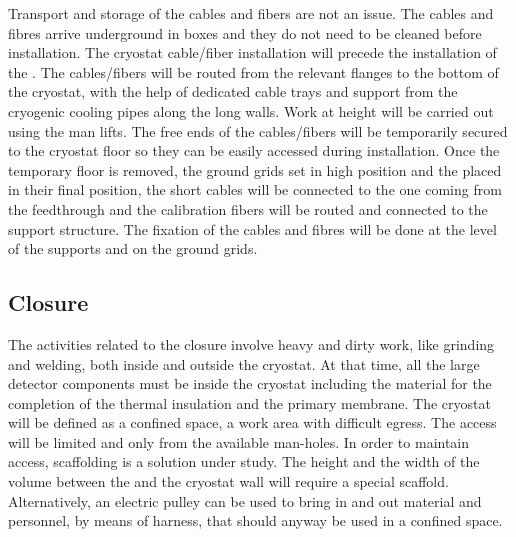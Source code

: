 Transport and storage of the cables and fibers are not an issue.
The cables and fibres arrive underground in boxes and they do not need to be cleaned before installation.
The cryostat cable/fiber installation will precede the installation of the .
The cables/fibers will be routed from the relevant flanges to the bottom of the cryostat, with the help of dedicated cable trays and support from the cryogenic cooling pipes along the long walls.
Work at height will be carried out using the man lifts.
The free ends of the cables/fibers will be temporarily secured to the cryostat floor so they can be easily accessed during installation.
Once the temporary floor is removed, the ground grids set in high position and the  placed in their final position, the short  cables will be connected to the one coming from the feedthrough and the calibration fibers will be routed and connected to the support structure.
The fixation of the cables and fibres will be done at the level of the  supports and on the ground grids.

\subsection{ Closure}
The activities related to the  closure involve heavy and dirty work, like grinding and welding, both inside and outside the cryostat.
At that time, all the large detector components must be inside the cryostat including the material for the completion of the thermal insulation and the primary membrane.
The cryostat will be defined as a confined space, a work area with difficult egress.
The access will be limited and only from the available man-holes.
In order to maintain access, scaffolding is a solution under study.
The height and the width of the volume between the  and the cryostat wall will require a special scaffold.
Alternatively, an electric pulley can be used to bring in and out material and personnel, by means of harness, that should anyway be used in a confined space.


